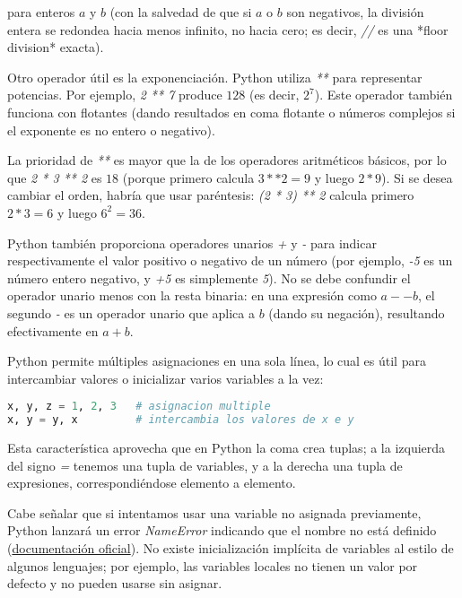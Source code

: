 para enteros $a$ y $b$ (con la salvedad de que si $a$ o $b$ son negativos, la división entera se redondea hacia menos infinito, 
no hacia cero; es decir, \textit{//} es una *floor division* exacta).

Otro operador útil es la exponenciación. Python utiliza \textit{**} para representar potencias. 
Por ejemplo, \textit{2 ** 7} produce $128$ (es decir, $2^7$). 
Este operador también funciona con flotantes (dando resultados en coma flotante o números complejos si el exponente es no entero o negativo). 

La prioridad de \textit{**} es mayor que la de los operadores aritméticos básicos, 
por lo que \textit{2 * 3 ** 2} es $18$ (porque primero calcula $3 ** 2 = 9$ y luego $2 * 9$). 
Si se desea cambiar el orden, habría que usar paréntesis: \textit{(2 * 3) ** 2} calcula primero $2 * 3 = 6$ y luego $6^{2} = 36$.

Python también proporciona operadores unarios \textit{+} y \textit{-} para indicar respectivamente el valor positivo o negativo de un número 
(por ejemplo, \textit{-5} es un número entero negativo, y \textit{+5} es simplemente \textit{5}). 
No se debe confundir el operador unario menos con la resta binaria: en una expresión como $a - -b$, 
el segundo \textit{-} es un operador unario que aplica a $b$ (dando su negación), resultando efectivamente en $a + b$.

Python permite múltiples asignaciones en una sola línea, lo cual es útil para intercambiar valores o inicializar varios variables a la vez:

\begin{lstlisting}[language=Python, caption={Asignación múltiple en Python.}]
x, y, z = 1, 2, 3   # asignacion multiple
x, y = y, x         # intercambia los valores de x e y
\end{lstlisting}

Esta característica aprovecha que en Python la coma crea tuplas; 
a la izquierda del signo \textit{=} tenemos una tupla de variables, 
y a la derecha una tupla de expresiones, correspondiéndose elemento a elemento.

Cabe señalar que si intentamos usar una variable no asignada previamente, 
Python lanzará un error \textit{NameError} indicando que el nombre no está definido 
(\href{https://docs.python.org/3/reference/executionmodel.html}{documentación oficial}). 
No existe inicialización implícita de variables al estilo de algunos lenguajes; 
por ejemplo, las variables locales no tienen un valor por defecto y no pueden usarse sin asignar.

